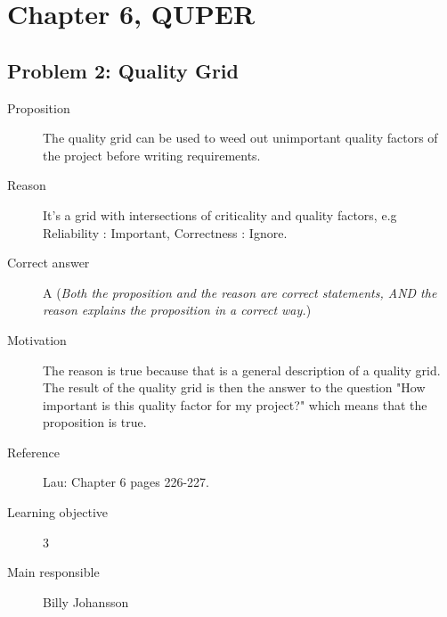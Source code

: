 \documentclass[10pt,a4paper]{article}
\begin{document}
\section*{Chapter 6, QUPER}
\subsection*{Problem 2: Quality Grid}
\begin{description}
\item[Proposition] The quality grid can be used to weed out unimportant quality factors of the project before writing requirements.
\item[Reason] It's a grid with intersections of criticality and quality factors, e.g Reliability : Important, Correctness : Ignore.
\item[Correct answer] A (\textit{Both the proposition and the reason are correct statements,
AND the reason explains the proposition in a correct way.})
\item[Motivation] The reason is true because that is a general description of a quality grid. The result of the quality grid is then the answer to the question "How important is this quality factor for my project?" which means that the proposition is true. 
\item[Reference] Lau: Chapter 6 pages 226-227.
\item[Learning objective] 3
\item[Main responsible] Billy Johansson
\end{description}

\end{document}

